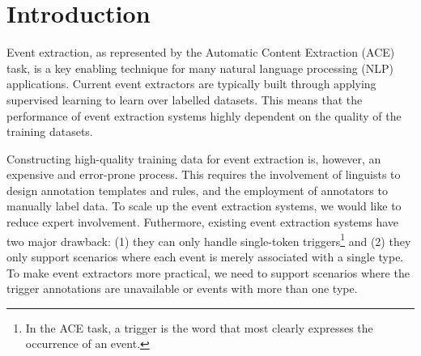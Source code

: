 \section{Introduction}
%

Event extraction, as represented by the Automatic Content Extraction (ACE) task, is a key enabling
technique for many natural language processing (NLP) applications.  Current event extractors are typically built through applying supervised learning to learn over labelled datasets. This means that the performance of event extraction systems highly dependent on the quality of the training datasets.

Constructing high-quality training data for event extraction is, however, an expensive and error-prone process. This requires the involvement of linguists to design annotation templates and rules, and the employment of annotators to manually label data. To scale up the event extraction systems, we would like to reduce expert involvement.
Futhermore, existing event extraction systems have two major drawback: (1) they can only handle single-token triggers\footnote{In the ACE task, a trigger is the word that most clearly expresses the occurrence of an event.} and (2) they only support scenarios where  each event is merely associated with a single type.
To make event extractors more practical, we need to support scenarios where the trigger annotations are unavailable or events with more than one type. 


